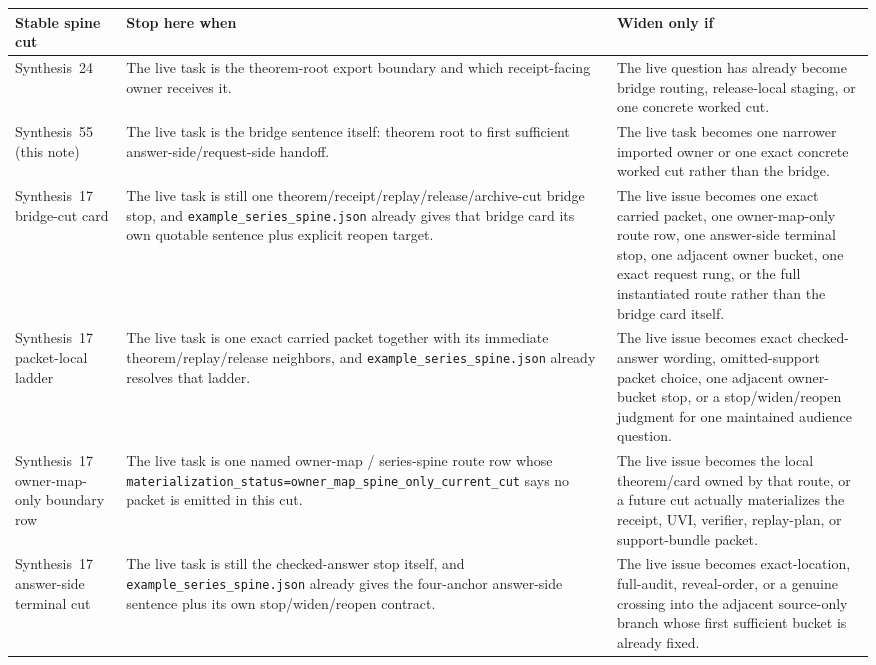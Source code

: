 \documentclass[11pt]{article}
\begin{document}
\begin{table}[t]
\centering
\small
\begin{tabularx}{\linewidth}{@{}L Y Y@{}}
\toprule
Stable spine cut & Stop here when & Widen only if \\
\midrule
Synthesis~24 & The live task is the theorem-root export boundary and which receipt-facing owner receives it. & The live question has already become bridge routing, release-local staging, or one concrete worked cut. \\
Synthesis~55 (this note) & The live task is the bridge sentence itself: theorem root to first sufficient answer-side/request-side handoff. & The live task becomes one narrower imported owner or one exact concrete worked cut rather than the bridge. \\
Synthesis~17 bridge-cut card & The live task is still one theorem/receipt/replay/release/archive-cut bridge stop, and \nolinkurl{example\_series\_spine.json} already gives that bridge card its own quotable sentence plus explicit reopen target. & The live issue becomes one exact carried packet, one owner-map-only route row, one answer-side terminal stop, one adjacent owner bucket, one exact request rung, or the full instantiated route rather than the bridge card itself. \\
Synthesis~17 packet-local ladder & The live task is one exact carried packet together with its immediate theorem/replay/release neighbors, and \nolinkurl{example\_series\_spine.json} already resolves that ladder. & The live issue becomes exact checked-answer wording, omitted-support packet choice, one adjacent owner-bucket stop, or a stop/widen/reopen judgment for one maintained audience question. \\
Synthesis~17 owner-map-only boundary row & The live task is one named owner-map / series-spine route row whose \texttt{materialization\_status=owner\_map\_spine\_only\_current\_cut} says no packet is emitted in this cut. & The live issue becomes the local theorem/card owned by that route, or a future cut actually materializes the receipt, UVI, verifier, replay-plan, or support-bundle packet. \\
Synthesis~17 answer-side terminal cut & The live task is still the checked-answer stop itself, and \nolinkurl{example\_series\_spine.json} already gives the four-anchor answer-side sentence plus its own stop/widen/reopen contract. & The live issue becomes exact-location, full-audit, reveal-order, or a genuine crossing into the adjacent source-only branch whose first sufficient bucket is already fixed. \\

\end{tabularx}
\end{table}
\end{document}
